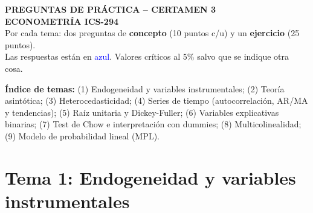 \documentclass[12pt,letterpaper]{article}
\newcommand{\tema}[1]{\section*{#1}}
\begin{document}
\begin{center}
{\large\textbf{PREGUNTAS DE PRÁCTICA -- CERTAMEN 3}}\\[0.3em]
{\large\textbf{ECONOMETRÍA ICS-294}}\\[0.3em]
\small Por cada tema: dos preguntas de \textbf{concepto} (10 puntos c/u) y un \textbf{ejercicio} (25 puntos).\\
Las respuestas están en \textcolor{blue}{azul}. Valores críticos al $5\%$ salvo que se indique otra cosa.
\end{center}

\vspace{0.5em}
\textbf{Índice de temas:}
(1) Endogeneidad y variables instrumentales;
(2) Teoría asintótica;
(3) Heterocedasticidad;
(4) Series de tiempo (autocorrelación, AR/MA y tendencias);
(5) Raíz unitaria y Dickey-Fuller;
(6) Variables explicativas binarias;
(7) Test de Chow e interpretación con dummies;
(8) Multicolinealidad;
(9) Modelo de probabilidad lineal (MPL).

\newpage
\tema{Tema 1: Endogeneidad y variables instrumentales}
\end{document}
